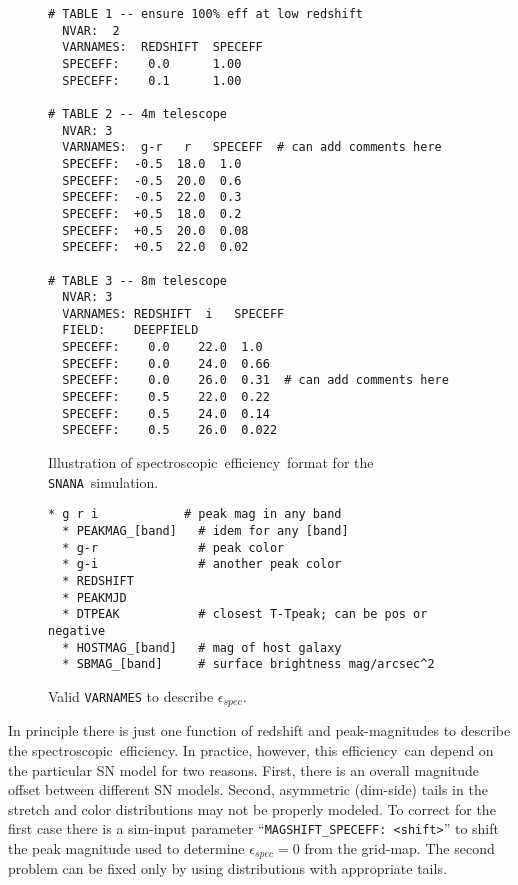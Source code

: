 \documentclass[12pt]{article}
\newcommand{\snana}{{\tt SNANA}}
\newcommand{\eff}{efficiency}
\newcommand{\simeffspec}{\epsilon_{spec}}
\newcommand{\spec}{spectroscopic}
\begin{document}
{%
\begin{figure}[hb] 
\begin{center}
\caption{Illustration of \spec\ \eff\ format for the \snana\ simulation.}
\label{fig:speceff}
\begin{Verbatim}[frame=single]
# TABLE 1 -- ensure 100% eff at low redshift
  NVAR:  2  
  VARNAMES:  REDSHIFT  SPECEFF
  SPECEFF:    0.0      1.00
  SPECEFF:    0.1      1.00

# TABLE 2 -- 4m telescope
  NVAR: 3
  VARNAMES:  g-r   r   SPECEFF  # can add comments here
  SPECEFF:  -0.5  18.0  1.0
  SPECEFF:  -0.5  20.0  0.6
  SPECEFF:  -0.5  22.0  0.3
  SPECEFF:  +0.5  18.0  0.2
  SPECEFF:  +0.5  20.0  0.08
  SPECEFF:  +0.5  22.0  0.02

# TABLE 3 -- 8m telescope
  NVAR: 3
  VARNAMES: REDSHIFT  i   SPECEFF  
  FIELD:    DEEPFIELD
  SPECEFF:    0.0    22.0  1.0
  SPECEFF:    0.0    24.0  0.66
  SPECEFF:    0.0    26.0  0.31  # can add comments here
  SPECEFF:    0.5    22.0  0.22
  SPECEFF:    0.5    24.0  0.14
  SPECEFF:    0.5    26.0  0.022
\end{Verbatim} 
\end{center} 
\end{figure}


\begin{figure}[hb] 
\begin{center}
\caption{ Valid {\tt VARNAMES} to describe $\simeffspec$. }
\label{fig:speceff_varnames}
\begin{Verbatim}[frame=single]
  * g r i            # peak mag in any band
  * PEAKMAG_[band]   # idem for any [band]
  * g-r              # peak color
  * g-i              # another peak color
  * REDSHIFT
  * PEAKMJD      
  * DTPEAK           # closest T-Tpeak; can be pos or negative
  * HOSTMAG_[band]   # mag of host galaxy
  * SBMAG_[band]     # surface brightness mag/arcsec^2
\end{Verbatim}
\end{center}
\end{figure}



In principle there is just one function of redshift and
peak-magnitudes to describe the \spec\ \eff. In practice,
however, this \eff\ can depend on the particular SN model
for two reasons. First, there is an overall magnitude offset
between different SN models. Second, asymmetric 
(dim-side) tails in the stretch and color distributions
may not be properly modeled. To correct for the first 
case there is a sim-input parameter 
``{\tt MAGSHIFT\_SPECEFF: <shift>}'' 
to shift the peak magnitude used to determine $\simeffspec=0$
from the grid-map.  The second problem can be fixed only
by using distributions with appropriate tails.



}
\end{document}

